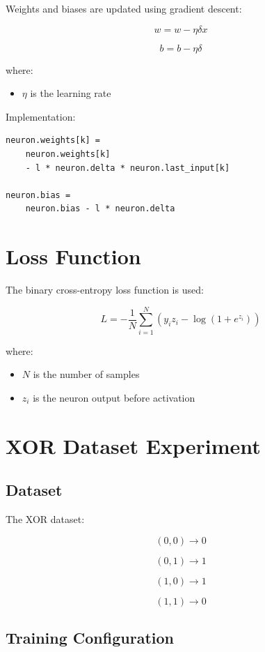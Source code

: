\documentclass[12pt]{article}
\begin{document}
Weights and biases are updated using gradient descent:

\[
w = w - \eta \delta x
\]

\[
b = b - \eta \delta
\]

where:
\begin{itemize}
    \item $\eta$ is the learning rate
\end{itemize}

Implementation:

\begin{verbatim}
neuron.weights[k] =
    neuron.weights[k]
    - l * neuron.delta * neuron.last_input[k]

neuron.bias =
    neuron.bias - l * neuron.delta
\end{verbatim}

\section{Loss Function}

The binary cross-entropy loss function is used:

\[
L = -\frac{1}{N}
\sum_{i=1}^{N}
\left(
y_i z_i - \log(1 + e^{z_i})
\right)
\]

where:
\begin{itemize}
    \item $N$ is the number of samples
    \item $z_i$ is the neuron output before activation
\end{itemize}

\section{XOR Dataset Experiment}

\subsection{Dataset}

The XOR dataset:

\[
(0,0) \rightarrow 0
\]

\[
(0,1) \rightarrow 1
\]

\[
(1,0) \rightarrow 1
\]

\[
(1,1) \rightarrow 0
\]

\subsection{Training Configuration}
\end{document}
